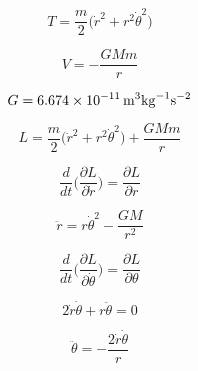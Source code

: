 \documentclass[a4paper,twoside, 11pt]{article}
\begin{document}
%
%
%


\[
    T = \frac{m}{2} \Big(  \dot{r}^2 + r^2 \dot{\theta}^2 \Big)
\]

\[
    V = -\frac{GMm}{r}
\]

\[
    G = \SI{6.674E-11}{\meter^{3} \kg^{-1} \second^{-2}}
\]

\[
    L = \frac{m}{2} \Big(  \dot{r}^2 + r^2 \dot{\theta}^2 \Big) + \frac{GMm}{r}
\]

\[
    \frac{d}{dt} \Big( \frac{\partial L}{\partial \dot{r}} \Big) = \frac{\partial L}{\partial r}
\]

\[
    \ddot{r} = r \dot{\theta}^2 - \frac{GM}{r^2}
\]

\[
    \frac{d}{dt} \Big( \frac{\partial L}{\partial \dot{\theta}} \Big) = \frac{\partial L}{\partial \theta}
\]

\[
    2 \dot{r} \dot{ \theta } + r \ddot{\theta} = 0
\]

\[
    \ddot{\theta} = - \frac{2 \dot{r} \dot{ \theta }}{r}
\]
\end{document}
